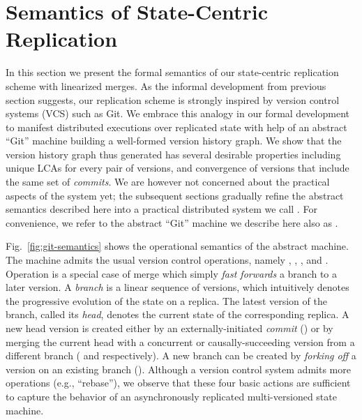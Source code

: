 \section{Semantics of State-Centric Replication}
\label{sec:abstract-sem}



In this section we present the formal semantics of our state-centric
replication scheme with linearized merges. As the informal development
from previous section suggests, our replication scheme is strongly
inspired by version control systems (VCS) such as Git.  We
embrace this analogy in our formal development to manifest distributed
executions over replicated state with help of an abstract ``Git''
machine building a well-formed version history graph.  We show that
the version history graph thus generated has several desirable
properties including unique LCAs for every pair of versions, and
convergence of versions that include the same set of \emph{commits}.
We are however not concerned about the practical aspects of the system
yet; the subsequent sections gradually refine the abstract semantics
described here into a practical distributed system we call \quark. For
convenience, we refer to the abstract ``Git'' machine we describe here
also as \quark.

Fig.~\ref{fig:git-semantics} shows the operational semantics of the
\quark abstract machine. The machine admits the usual version control
operations, namely , ,
, and . Operation
 is a special case of merge which simply \emph{fast
forwards} a branch to a later version. A \emph{branch} is a linear
sequence of versions, which intuitively denotes the progressive
evolution of the state on a replica. The latest version of the branch,
called its \emph{head}, denotes the current state of the corresponding
replica. A new head version is created either by an
externally-initiated \emph{commit} () or by merging
the current head with a concurrent or causally-succeeding version from
a different branch ( and 
respectively). A new branch can be created by \emph{forking off} a
version on an existing branch (). Although a version
control system admits more operations (e.g., ``rebase''), we observe
that these four basic actions are sufficient to capture the behavior
of an asynchronously replicated multi-versioned state machine.

